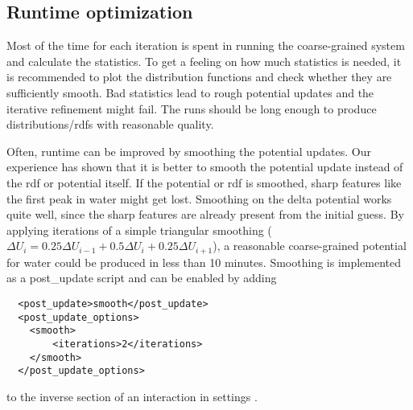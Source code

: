 \subsection{Runtime optimization}
Most of the time for each iteration is spent in running the coarse-grained system and calculate the statistics. To get a feeling on how much statistics is needed, it is recommended to plot the distribution functions and check whether they are sufficiently smooth. Bad statistics lead to rough potential updates and the iterative refinement might fail. The runs should be long enough to produce distributions/rdfs with reasonable quality.

Often, runtime can be improved by smoothing the potential updates. Our experience has shown that it is better to smooth the potential update instead of the rdf or potential itself. If the potential or rdf is smoothed, sharp features like the first peak in \spce water might get lost. Smoothing on the delta potential works quite well, since the sharp features are already present from the initial guess. By applying iterations of a simple triangular smoothing ($ \Delta U_i = 0.25 \Delta U_{i-1} + 0.5\Delta U_i + 0.25\Delta U_{i+1} $), a reasonable coarse-grained potential for \spce water could be produced in less than 10 minutes. Smoothing is implemented as a post\_update script and can be enabled by adding
\begin{lstlisting}
  <post_update>smooth</post_update>
  <post_update_options>
    <smooth>
        <iterations>2</iterations>
    </smooth>
  </post_update_options>
\end{lstlisting}
to the inverse section of an interaction in settings \xml.



